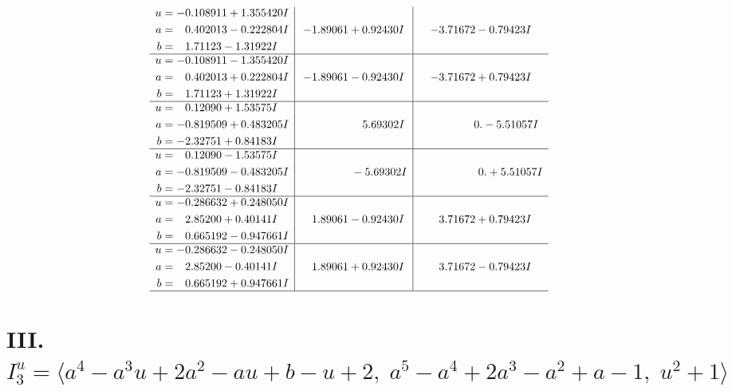 \documentclass[1p]{elsarticle_modified}
\theoremstyle{definition}
\begin{document}
$$\begin{array}{c|c|c}
\begin{aligned}
u &= -0.108911 + 1.355420 I \\
a &= \phantom{-}0.402013 - 0.222804 I \\
b &= \phantom{-}1.71123 - 1.31922 I\end{aligned}
 & -1.89061 + 0.92430 I & -3.71672 - 0.79423 I \\ \hline\begin{aligned}
u &= -0.108911 - 1.355420 I \\
a &= \phantom{-}0.402013 + 0.222804 I \\
b &= \phantom{-}1.71123 + 1.31922 I\end{aligned}
 & -1.89061 - 0.92430 I & -3.71672 + 0.79423 I \\ \hline\begin{aligned}
u &= \phantom{-}0.12090 + 1.53575 I \\
a &= -0.819509 + 0.483205 I \\
b &= -2.32751 + 0.84183 I\end{aligned}
 & \phantom{-0.000000 -}5.69302 I & \phantom{-0.000000 } 0. - 5.51057 I \\ \hline\begin{aligned}
u &= \phantom{-}0.12090 - 1.53575 I \\
a &= -0.819509 - 0.483205 I \\
b &= -2.32751 - 0.84183 I\end{aligned}
 & \phantom{-0.000000 } -5.69302 I & \phantom{-0.000000 -}0. + 5.51057 I \\ \hline\begin{aligned}
u &= -0.286632 + 0.248050 I \\
a &= \phantom{-}2.85200 + 0.40141 I \\
b &= \phantom{-}0.665192 - 0.947661 I\end{aligned}
 & \phantom{-}1.89061 - 0.92430 I & \phantom{-}3.71672 + 0.79423 I \\ \hline\begin{aligned}
u &= -0.286632 - 0.248050 I \\
a &= \phantom{-}2.85200 - 0.40141 I \\
b &= \phantom{-}0.665192 + 0.947661 I\end{aligned}
 & \phantom{-}1.89061 + 0.92430 I & \phantom{-}3.71672 - 0.79423 I\\
 \hline 
 \end{array}$$\newpage\newpage\renewcommand{\arraystretch}{1}
\centering \section*{III. $I^u_{3}= \langle a^4- a^3 u+2 a^2- a u+b- u+2,\;a^5- a^4+2 a^3- a^2+a-1,\;u^2+1 \rangle$}
\end{document}
